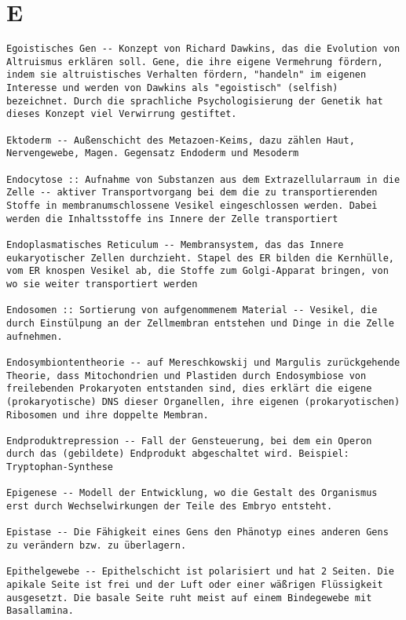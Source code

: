 \documentclass{article}
\begin{document}
\section{E}
\begin{verbatim}
Egoistisches Gen -- Konzept von Richard Dawkins, das die Evolution von Altruismus erklären soll. Gene, die ihre eigene Vermehrung fördern, indem sie altruistisches Verhalten fördern, "handeln" im eigenen Interesse und werden von Dawkins als "egoistisch" (selfish) bezeichnet. Durch die sprachliche Psychologisierung der Genetik hat dieses Konzept viel Verwirrung gestiftet.

Ektoderm -- Außenschicht des Metazoen-Keims, dazu zählen Haut, Nervengewebe, Magen. Gegensatz Endoderm und Mesoderm

Endocytose :: Aufnahme von Substanzen aus dem Extrazellularraum in die Zelle -- aktiver Transportvorgang bei dem die zu transportierenden Stoffe in membranumschlossene Vesikel eingeschlossen werden. Dabei werden die Inhaltsstoffe ins Innere der Zelle transportiert

Endoplasmatisches Reticulum -- Membransystem, das das Innere eukaryotischer Zellen durchzieht. Stapel des ER bilden die Kernhülle, vom ER knospen Vesikel ab, die Stoffe zum Golgi-Apparat bringen, von wo sie weiter transportiert werden

Endosomen :: Sortierung von aufgenommenem Material -- Vesikel, die durch Einstülpung an der Zellmembran entstehen und Dinge in die Zelle aufnehmen.

Endosymbiontentheorie -- auf Mereschkowskij und Margulis zurückgehende Theorie, dass Mitochondrien und Plastiden durch Endosymbiose von freilebenden Prokaryoten entstanden sind, dies erklärt die eigene (prokaryotische) DNS dieser Organellen, ihre eigenen (prokaryotischen) Ribosomen und ihre doppelte Membran.

Endproduktrepression -- Fall der Gensteuerung, bei dem ein Operon durch das (gebildete) Endprodukt abgeschaltet wird. Beispiel: Tryptophan-Synthese

Epigenese -- Modell der Entwicklung, wo die Gestalt des Organismus erst durch Wechselwirkungen der Teile des Embryo entsteht.

Epistase -- Die Fähigkeit eines Gens den Phänotyp eines anderen Gens zu verändern bzw. zu überlagern.

Epithelgewebe -- Epithelschicht ist polarisiert und hat 2 Seiten. Die apikale Seite ist frei und der Luft oder einer wäßrigen Flüssigkeit ausgesetzt. Die basale Seite ruht meist auf einem Bindegewebe mit Basallamina.


\end{verbatim}
\end{document}
